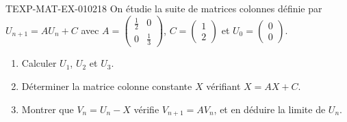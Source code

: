 \begin{exercice}{TEXP-MAT-EX-010}{2}{18}
On étudie la suite de matrices colonnes définie par
$U_{n+1}=AU_n+C$ avec $A=\begin{pmatrix}\tfrac12&0\\0&\tfrac13\end{pmatrix}$,
$C=\begin{pmatrix}1\\2\end{pmatrix}$ et $U_0=\begin{pmatrix}0\\0\end{pmatrix}$.
\begin{enumerate}
  \item Calculer $U_1$, $U_2$ et $U_3$.
  \item Déterminer la matrice colonne constante $X$ vérifiant $X=AX+C$.
  \item Montrer que $V_n=U_n-X$ vérifie $V_{n+1}=AV_n$, et en déduire la
        limite de $U_n$.
\end{enumerate}
\end{exercice}
